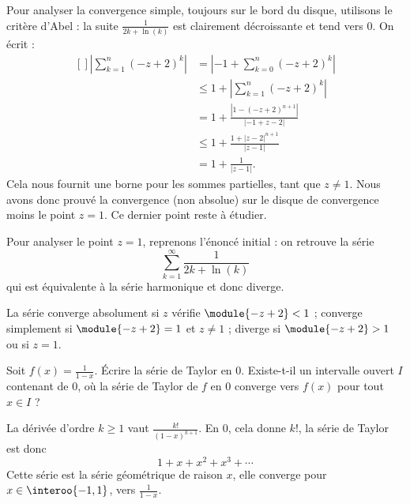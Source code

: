 \documentclass[12pt,french,oneside,a4paper]{memoir} %
\begin{document}
\begin{exo}
\begin{correction}
\begin{enumerate}
Pour analyser la convergence simple, toujours sur le bord du disque, utilisons le critère d'Abel : la suite $\frac{1}{2k+\ln(k)}$ est clairement décroissante et tend vers $0$. On écrit :
\begin{equation}
	\begin{aligned}[]
		\left| \sum_{k=1}^n(-z+2)^k \right| &=\left| -1+\sum_{k=0}^n(-z+2)^k \right| \\
			&\leq 1+\left| \sum_{k=1}^n(-z+2)^k \right| \\
			&=1+\frac{ | 1-(-z+2)^{n+1} | }{ |-1+z-2| }\\
			&\leq 1+\frac{ 1+| z-2 |^{n+1} }{ | z-1 | }\\
			&=1+\frac{1}{ | z-1 | }.
	\end{aligned}
\end{equation}
Cela nous fournit une borne pour les sommes partielles, tant que $z\neq 1$. Nous avons donc prouvé la convergence (non absolue) sur le disque de convergence moins le point $z=1$. Ce dernier point reste à étudier.

Pour analyser le point $z = 1$, reprenons l'énoncé initial : on retrouve la série
\begin{equation*}
\sum_{k=1}^\infty \frac{1}{2k + \ln(k)}    
\end{equation*}
qui est équivalente à la série harmonique et donc diverge.

\conclusion La série converge absolument si $z$ vérifie $\module{-z
+2}<1$ ; converge simplement si $\module{-z+2} = 1$ et $z \neq 1$
; diverge si $\module{-z+2}>1$ ou si $z = 1$.
\end{enumerate}
\end{correction}
\end{exo}
\begin{exo}
Soit $f(x) = \frac{1}{1-x}$. Écrire la série de Taylor en $0$. Existe-t-il un intervalle ouvert $I$ contenant de $0$, où la série de Taylor de $f$ en $0$ converge vers $f(x)$ pour tout $x\in I$ ?

\begin{correction}
  La dérivée d'ordre $k \geq 1$ vaut $\frac {k!} {(1-x)^{k+1}}$. En $0$, cela donne $k!$, la série de Taylor est donc
  \begin{equation*}
    1 + x + x^{2} + x^{3} + \cdots
  \end{equation*}
  Cette série est la série géométrique de raison $x$, elle converge pour $x \in \interoo{-1,1}$, vers $\frac 1{1-x}$.
\end{correction}
\end{exo}
\end{document}
